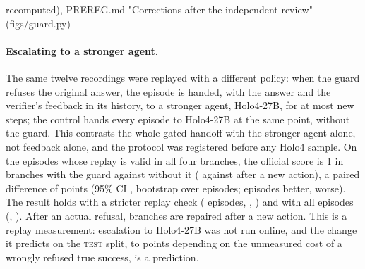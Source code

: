 recomputed), PREREG.md "Corrections after the independent review" (figs/guard.py)

\paragraph{Escalating to a stronger agent.} The same twelve recordings were replayed with a different policy: when the guard refuses the original answer, the episode is handed, with the answer and the verifier's feedback in its history, to a stronger agent, Holo4-27B, for at most \rbMaxNew{} new steps; the control hands every episode to Holo4-27B at the same point, without the guard. This contrasts the whole gated handoff with the stronger agent alone, not feedback alone, and the protocol was registered before any Holo4 sample. On the \rbPrimEpisodes{} episodes whose replay is valid in all four branches, the official score is 1 in \rbGuardSucc{} branches with the guard against \rbCtrlSucc{} without it (\rbGuardAfterAction{} against \rbCtrlAfterAction{} after a new action), a paired difference of \rbPrimDiff{} points (95\% CI \rbPrimDiffCi, bootstrap over episodes; \rbBetter{} episodes better, \rbWorse{} worse). The result holds with a stricter replay check (\rbStrictEpisodes{} episodes, \rbStrictDiff, \rbStrictDiffCi) and with all \rbAllEpisodes{} episodes (\rbAllDiff, \rbAllDiffCi). After an actual refusal, \rbRefRepaired{} branches are repaired after a new action. This is a replay measurement: escalation to Holo4-27B was not run online, and the change it predicts on the \textsc{test} split, \rbPredLo{} to \rbPredHi{} points depending on the unmeasured cost of a wrongly refused true success, is a prediction. %

